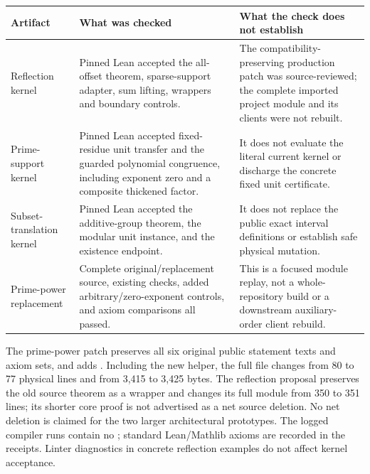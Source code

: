 \begin{longtable}{p{}p{}p{}}
\toprule
Artifact & What was checked & What the check does not establish\\
\midrule
\endhead
Reflection kernel & Pinned Lean accepted the all-offset theorem, sparse-support adapter, sum lifting, wrappers and boundary controls. & The compatibility-preserving production patch was source-reviewed; the complete imported project module and its clients were not rebuilt.\\
Prime-support kernel & Pinned Lean accepted fixed-residue unit transfer and the guarded polynomial congruence, including exponent zero and a composite thickened factor. & It does not evaluate the literal current kernel or discharge the concrete fixed unit certificate.\\
Subset-translation kernel & Pinned Lean accepted the additive-group theorem, the modular unit instance, and the existence endpoint. & It does not replace the public exact interval definitions or establish safe physical mutation.\\
Prime-power replacement & Complete original/replacement source, existing checks, added arbitrary/zero-exponent controls, and axiom comparisons all passed. & This is a focused module replay, not a whole-repository build or a downstream auxiliary-order client rebuild.\\
\bottomrule
\end{longtable}

\noindent The prime-power patch preserves all six original public statement
texts and axiom sets, and adds . Including the new
helper, the full file changes from 80 to 77 physical lines and from 3,415
to 3,425 bytes. The reflection proposal preserves the old source theorem
as a wrapper and changes its full module from 350 to 351 lines; its shorter
core proof is not advertised as a net source deletion. No net deletion is
claimed for the two larger architectural prototypes. The logged compiler
runs contain no ; standard Lean/Mathlib axioms are recorded
in the receipts. Linter diagnostics in concrete reflection examples do not
affect kernel acceptance.
